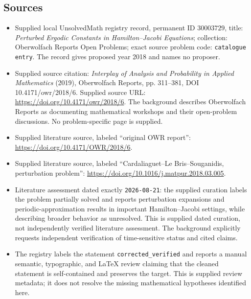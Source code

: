 \documentclass[11pt]{article}
\begin{document}
\subsection{Sources}
\begin{itemize}
\item Supplied local UnsolvedMath registry record, permanent ID \(30003729\), title: \emph{Perturbed Ergodic Constants in Hamilton--Jacobi Equations}; collection: Oberwolfach Reports Open Problems; exact source problem code: \texttt{catalogue entry}. The record gives proposed year 2018 and names no proposer.
\item Supplied source citation: \emph{Interplay of Analysis and Probability in Applied Mathematics} (2019), Oberwolfach Reports, pp. 311--381, DOI 10.4171/owr/2018/6. Supplied source URL: \url{https://doi.org/10.4171/owr/2018/6}. The background describes Oberwolfach Reports as documenting mathematical workshops and their open-problem discussions. No problem-specific page is supplied.
\item Supplied literature source, labeled ``original OWR report'': \url{https://doi.org/10.4171/OWR/2018/6}.
\item Supplied literature source, labeled ``Cardaliaguet--Le Bris--Souganidis, perturbation problem'': \url{https://doi.org/10.1016/j.matpur.2018.03.005}.
\item Literature assessment dated exactly \texttt{2026-08-21}: the supplied curation labels the problem partially solved and reports perturbation expansions and periodic-approximation results in important Hamilton--Jacobi settings, while describing broader behavior as unresolved. This is supplied dated curation, not independently verified literature assessment. The background explicitly requests independent verification of time-sensitive status and cited claims.
\item The registry labels the statement \texttt{corrected\_verified} and reports a manual semantic, typographic, and LaTeX review claiming that the cleaned statement is self-contained and preserves the target. This is supplied review metadata; it does not resolve the missing mathematical hypotheses identified here.
\end{itemize}
\end{document}
